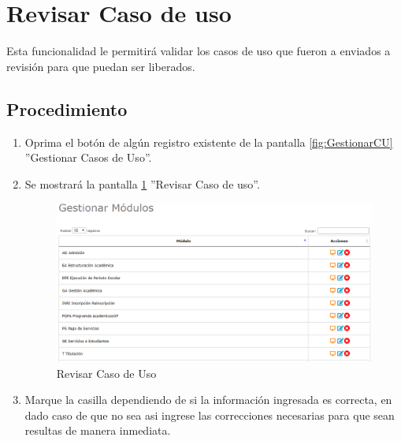 \hypertarget{cv:revisarCU}{\section{Revisar Caso de uso}} \label{sec:revisarCU}

	Esta funcionalidad le permitirá validar los casos de uso que fueron a enviados a revisión para que puedan ser liberados.
		\subsection{Procedimiento}

			\begin{enumerate}
			
			\item Oprima el botón \IURevisar{} de algún registro existente de la pantalla \ref{fig:GestionarCU} ''Gestionar Casos de Uso''.
	
			\item Se mostrará la pantalla \ref{fig:RevisarCU} ''Revisar Caso de uso''.

			\begin{figure}[htbp!]
				\begin{center}
					\includegraphics[scale=0.6]{roles/lider/casosUso/pantallas/IU5gestionarModulos}
					\caption{Revisar Caso de Uso}
					\label{fig:RevisarCU}
				\end{center}
			\end{figure}
		
				\item Marque la casilla dependiendo de si la información ingresada es correcta, en dado caso de que no sea asi ingrese las correcciones necesarias para que sean resultas de manera inmediata.
				

\end{enumerate}
